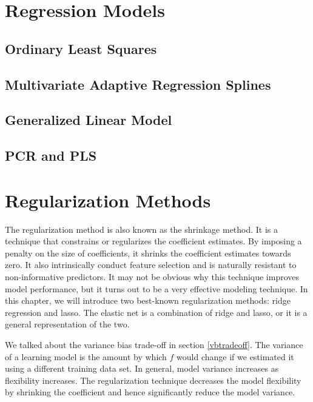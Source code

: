 \documentclass[12pt,]{krantz}
\begin{document}
\hypertarget{regression-models}{%
\chapter{Regression Models}\label{regression-models}}

\hypertarget{ordinary-least-squares}{%
\section{Ordinary Least Squares}\label{ordinary-least-squares}}

\hypertarget{multivariate-adaptive-regression-splines}{%
\section{Multivariate Adaptive Regression Splines}\label{multivariate-adaptive-regression-splines}}

\hypertarget{generalized-linear-model}{%
\section{Generalized Linear Model}\label{generalized-linear-model}}

\hypertarget{pcr-and-pls}{%
\section{PCR and PLS}\label{pcr-and-pls}}

\hypertarget{regularization-methods}{%
\chapter{Regularization Methods}\label{regularization-methods}}

The regularization method is also known as the shrinkage method. It is a technique that constrains or regularizes the coefficient estimates. By imposing a penalty on the size of coefficients, it shrinks the coefficient estimates towards zero. It also intrinsically conduct feature selection and is naturally resistant to non-informative predictors. It may not be obvious why this technique improves model performance, but it turns out to be a very effective modeling technique. In this chapter, we will introduce two best-known regularization methods: ridge regression and lasso. The elastic net is a combination of ridge and lasso, or it is a general representation of the two.

We talked about the variance bias trade-off in section \ref{vbtradeoff}. The variance of a learning model is the amount by which \(\hat{f}\) would change if we estimated it using a different training data set. In general, model variance increases as flexibility increases. The regularization technique decreases the model flexibility by shrinking the coefficient and hence significantly reduce the model variance.
\end{document}
